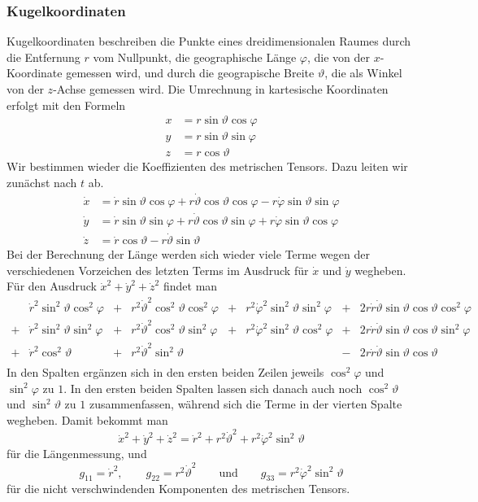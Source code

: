 \subsubsection{Kugelkoordinaten}
Kugelkoordinaten beschreiben die Punkte eines dreidimensionalen Raumes
durch die Entfernung $r$ vom Nullpunkt, die geographische Länge
$\varphi$, die von
der $x$-Koordinate gemessen wird, und durch die geograpische Breite
$\vartheta$,
die als Winkel von der $z$-Achse gemessen wird.
Die Umrechnung in kartesische Koordinaten erfolgt mit den Formeln
\begin{align*}
x&= r\sin\vartheta\cos\varphi\\
y&= r\sin\vartheta\sin\varphi\\
z&= r\cos\vartheta
\end{align*}
Wir bestimmen wieder die Koeffizienten des metrischen Tensors.
Dazu leiten wir zunächst nach $t$ ab.
\begin{align*}
\dot x
&=
\dot r\sin\vartheta\cos\varphi
+
r\dot\vartheta \cos\vartheta\cos\varphi
-
r\dot\varphi \sin\vartheta\sin\varphi
\\
\dot y
&=
\dot r\sin\vartheta\sin\varphi
+
r\dot\vartheta\cos\vartheta\sin\varphi
+
r\dot\varphi\sin\vartheta\cos\varphi
\\
\dot z
&=
\dot r\cos\vartheta
-
r\dot\vartheta \sin\vartheta
\end{align*}
Bei der Berechnung der Länge werden sich wieder viele Terme
wegen der verschiedenen Vorzeichen des letzten Terms im
Ausdruck für $\dot x$ und $\dot y$ wegheben.
Für den Ausdruck $ \dot x^2 + \dot y^2 + \dot z^2$ findet man
\[
\begin{array}{clclclcl}
 &
\dot r^2\sin^2\vartheta\cos^2\varphi
	&+&r^2\dot\vartheta^2\cos^2\vartheta\cos^2\varphi
		&+&r^2\dot\varphi^2\sin^2\vartheta\sin^2\varphi
			&+&2r\dot r\dot\vartheta\sin\vartheta\cos\vartheta\cos^2\varphi
\\
+&
\dot r^2\sin^2\vartheta\sin^2\varphi
	&+&r^2\dot\vartheta^2\cos^2\vartheta\sin^2\varphi
		&+&r^2\dot\varphi^2\sin^2\vartheta\cos^2\varphi
			&+&2r\dot r\dot\vartheta\sin\vartheta\cos\vartheta\sin^2\varphi
\\
+&
\dot r^2\cos^2\vartheta
	&+&r^2\dot\vartheta^2\sin^2\vartheta
		& &
			&-&2r\dot r\dot\vartheta \sin\vartheta \cos\vartheta
\\
\end{array}
\]
In den Spalten ergänzen sich in den ersten beiden Zeilen jeweils
$\cos^2\varphi$ und $\sin^2\varphi$ zu $1$.
In den ersten beiden Spalten lassen sich danach auch noch
$\cos^2\vartheta$ und $\sin^2\vartheta$ zu $1$ zusammenfassen,
während sich die Terme in der vierten Spalte wegheben.
Damit bekommt man
\begin{equation}
\dot x^2 + \dot y^2 + \dot z^2
=
\dot r^2+r^2\dot\vartheta^2 + r^2\dot\varphi^2\sin^2\vartheta
\label{skript:kruemmung:kugelkoordinaten}
\end{equation}
für die Längenmessung, und
\[
g_{11}=\dot r^2,\qquad
g_{22}=r^2\dot\vartheta^2
\qquad\text{und}\qquad
g_{33}= r^2\dot\varphi^2\sin^2\vartheta
\]
für die nicht verschwindenden Komponenten des metrischen Tensors.


